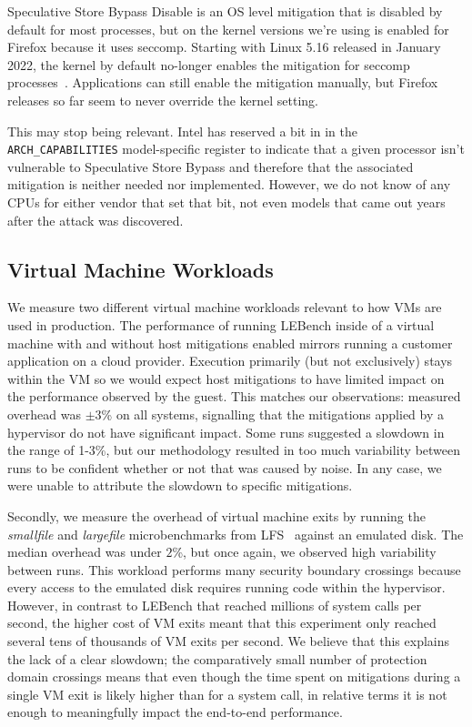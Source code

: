 Speculative Store Bypass Disable is an OS level mitigation that is disabled by default for most processes, but on the kernel versions we're using is enabled for Firefox because it uses seccomp.
Starting with Linux 5.16 released in January 2022, the kernel by default no-longer enables the mitigation for seccomp processes~\cite{phoronix:ssbd-defaults}.
Applications can still enable the mitigation manually, but Firefox releases so far seem to never override the kernel setting.

This may stop being relevant.
Intel has reserved a bit in in the \texttt{ARCH\_CAPABILITIES} model-specific register to indicate that a given processor isn't vulnerable to Speculative Store Bypass and therefore that the associated mitigation is neither needed nor implemented.
However, we do not know of any CPUs for either vendor that set that bit, not even models that came out years after the attack was discovered.

\subsection{Virtual Machine Workloads}
\label{sec:benchmarks:vm}

We measure two different virtual machine workloads relevant to how VMs are used in production.
The performance of running LEBench inside of a virtual machine with and without host mitigations enabled mirrors running a customer application on a cloud provider.
Execution primarily (but not exclusively) stays within the VM so we would expect host mitigations to have limited impact on the performance observed by the guest.
This matches our observations: measured overhead was $\pm 3$\% on all systems, signalling that the mitigations applied by a hypervisor do not have significant impact.
Some runs suggested a slowdown in the range of 1-3\%, but our methodology resulted in too much variability between runs to be confident whether or not that was caused by noise. 
In any case, we were unable to attribute the slowdown to specific mitigations.

Secondly, we measure the overhead of virtual machine exits by running the \textit{smallfile} and \textit{largefile} microbenchmarks from LFS~\cite{rosenblum:lfs} against an emulated disk.
The median overhead was under $2$\%, but once again, we observed high variability between runs.
This workload performs many security boundary crossings because every access to the emulated disk requires running code within the hypervisor.
However, in contrast to LEBench that reached millions of system calls per second, the higher cost of VM exits meant that this experiment only reached several tens of thousands of VM exits per second.
We believe that this explains the lack of a clear slowdown; the comparatively small number of protection domain crossings means that even though the time spent on mitigations during a single VM exit is likely higher than for a system call, in relative terms it is not enough to meaningfully impact the end-to-end performance.

